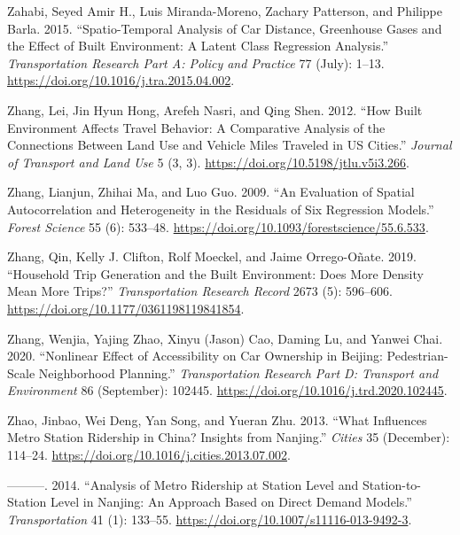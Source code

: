 \documentclass[
  11pt,
  openany]{memoir}
\newlength{\cslhangindent}
\newlength{\cslentryspacingunit} %
\newenvironment{CSLReferences}[2] %
 {%
  \setlength{\parindent}{0pt}
  \ifodd #1
  \let\oldpar\par
  \def\par{\hangindent=\cslhangindent\oldpar}
  \fi
  \setlength{\parskip}{#2\cslentryspacingunit}
 }%
 {}
\begin{document}
\begin{CSLReferences}{1}{0}
\leavevmode{}%
Zahabi, Seyed Amir H., Luis Miranda-Moreno, Zachary Patterson, and Philippe Barla. 2015. {``Spatio-Temporal Analysis of Car Distance, Greenhouse Gases and the Effect of Built Environment: A Latent Class Regression Analysis.''} \emph{Transportation Research Part A: Policy and Practice} 77 (July): 1--13. \url{https://doi.org/10.1016/j.tra.2015.04.002}.

\leavevmode{}%
Zhang, Lei, Jin Hyun Hong, Arefeh Nasri, and Qing Shen. 2012. {``How Built Environment Affects Travel Behavior: A Comparative Analysis of the Connections Between Land Use and Vehicle Miles Traveled in {US} Cities.''} \emph{Journal of Transport and Land Use} 5 (3, 3). \url{https://doi.org/10.5198/jtlu.v5i3.266}.

\leavevmode{}%
Zhang, Lianjun, Zhihai Ma, and Luo Guo. 2009. {``An {Evaluation} of {Spatial Autocorrelation} and {Heterogeneity} in the {Residuals} of {Six Regression Models}.''} \emph{Forest Science} 55 (6): 533--48. \url{https://doi.org/10.1093/forestscience/55.6.533}.

\leavevmode{}%
Zhang, Qin, Kelly J. Clifton, Rolf Moeckel, and Jaime Orrego-Oñate. 2019. {``Household {Trip Generation} and the {Built Environment}: Does {More Density Mean More Trips}?''} \emph{Transportation Research Record} 2673 (5): 596--606. \url{https://doi.org/10.1177/0361198119841854}.

\leavevmode{}%
Zhang, Wenjia, Yajing Zhao, Xinyu (Jason) Cao, Daming Lu, and Yanwei Chai. 2020. {``Nonlinear Effect of Accessibility on Car Ownership in {Beijing}: Pedestrian-Scale Neighborhood Planning.''} \emph{Transportation Research Part D: Transport and Environment} 86 (September): 102445. \url{https://doi.org/10.1016/j.trd.2020.102445}.

\leavevmode{}%
Zhao, Jinbao, Wei Deng, Yan Song, and Yueran Zhu. 2013. {``What Influences {Metro} Station Ridership in {China}? Insights from {Nanjing}.''} \emph{Cities} 35 (December): 114--24. \url{https://doi.org/10.1016/j.cities.2013.07.002}.

\leavevmode{}%
---------. 2014. {``Analysis of {Metro} Ridership at Station Level and Station-to-Station Level in {Nanjing}: An Approach Based on Direct Demand Models.''} \emph{Transportation} 41 (1): 133--55. \url{https://doi.org/10.1007/s11116-013-9492-3}.


\end{CSLReferences}
\end{document}
